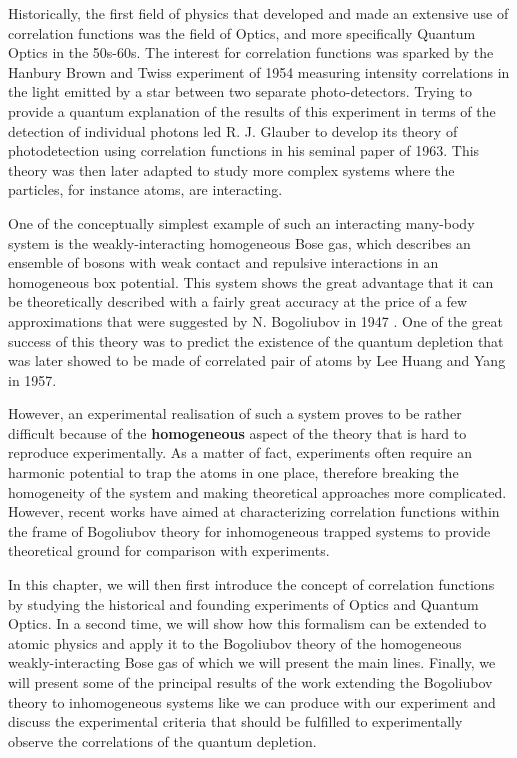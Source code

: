 Historically, the first field of physics that developed and made an extensive use of correlation functions was the field of Optics, and more specifically Quantum Optics in the 50s-60s. The interest for correlation functions was sparked by the Hanbury Brown and Twiss experiment of 1954 measuring intensity correlations in the light emitted by a star between two separate photo-detectors. Trying to provide a quantum explanation of the results of this experiment in terms of the detection of individual photons led R. J. Glauber to develop its theory of photodetection \cite{glauber1963quantum} using correlation functions in his seminal paper of 1963. This theory was then later adapted to study more complex systems where the particles, for instance atoms, are interacting. 

One of the conceptually simplest example of such an interacting many-body system is the weakly-interacting homogeneous Bose gas, which describes an ensemble of bosons with weak contact and repulsive interactions in an homogeneous box potential. This system shows the great advantage that it can be theoretically described with a fairly great accuracy at the price of a few approximations that were suggested by N. Bogoliubov in 1947 \cite{bogoliubov1947}. One of the great success of this theory was to predict the existence of the quantum depletion that was later showed to be made of \kmk correlated pair of atoms by Lee Huang and Yang \cite{lee1957} in 1957.

However, an experimental realisation of such a system proves to be rather difficult because of the \textbf{homogeneous} aspect of the theory that is hard to reproduce experimentally. As a matter of fact, experiments often require an harmonic potential to trap the atoms in one place, therefore breaking the homogeneity of the system and making theoretical approaches more complicated. However, recent works \cite{butera2020,mathey2009noise,toth2008theory} have aimed at characterizing correlation functions within the frame of Bogoliubov theory for inhomogeneous trapped systems to provide theoretical ground for comparison with experiments. 

In this chapter, we will then first introduce the concept of correlation functions by studying the historical and founding experiments of Optics and Quantum Optics. In a second time, we will show how this formalism can be extended to atomic physics and apply it to the Bogoliubov theory of the homogeneous weakly-interacting Bose gas of which we will present the main lines. Finally, we will present some of the principal results of the work \cite{butera2020} extending the Bogoliubov theory to inhomogeneous systems like we can produce with our experiment and discuss the experimental criteria that should be fulfilled to experimentally observe the \kmk correlations of the quantum depletion. 





